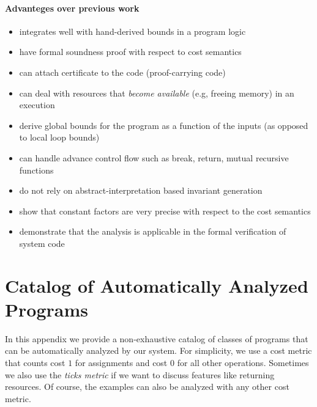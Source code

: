 \documentclass[nocopyrightspace,preprint]{sigplanconf}
\begin{document}
\paragraph{Advanteges over previous work}

\begin{itemize}
\item integrates well with hand-derived bounds in a program logic
\item have formal soundness proof with respect to cost semantics
\item can attach certificate to the code (proof-carrying code)
\item can deal with resources that \emph{become available} (e.g, freeing memory) in an execution
\item derive global bounds for the program as a function of the inputs (as opposed to local loop bounds)
\item can handle advance control flow such as break, return, mutual recursive functions
\item do not rely on abstract-interpretation based invariant generation
\item show that constant factors are very precise with respect to the cost semantics
\item demonstrate that the analysis is applicable in the formal verification of system code
\end{itemize}




\clearpage
\appendix

\section{Catalog of Automatically Analyzed Programs}
\label{app:cat}

In this appendix we provide a non-exhaustive catalog of classes of
programs that can be automatically analyzed by our system.  For
simplicity, we use a cost metric that counts cost $1$ for assignments
and cost $0$ for all other operations.  Sometimes we also use the
\emph{ticks metric} if we want to discuss features like returning
resources.  Of course, the examples can also be analyzed with any other
cost metric.
\end{document}
